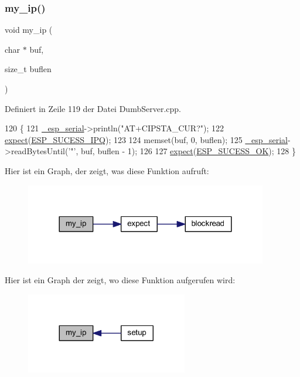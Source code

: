 \subsubsection{\texorpdfstring{my\+\_\+ip()}{my\_ip()}}
{\footnotesize\ttfamily void my\+\_\+ip (\begin{DoxyParamCaption}\item[{char $\ast$}]{buf,  }\item[{size\+\_\+t}]{buflen }\end{DoxyParamCaption})}



Definiert in Zeile 119 der Datei Dumb\+Server.\+cpp.


\begin{DoxyCode}
120 \{
121   \hyperlink{class_esp_server_a552aab874ad99b696f4c997d6f5a4746}{\_esp\_serial}->println(\textcolor{stringliteral}{"AT+CIPSTA\_CUR?"});
122   \hyperlink{class_esp_server_aff5ea67ab96af075223b2b836036ccf1}{expect}(\hyperlink{_dumb_server_8cpp_a4a3c8fcc7b628944ea321ad928a00bd9}{ESP\_SUCESS\_IPQ});
123 
124   memset(buf, 0, buflen);
125   \hyperlink{class_esp_server_a552aab874ad99b696f4c997d6f5a4746}{\_esp\_serial}->readBytesUntil(\textcolor{charliteral}{'"'}, buf, buflen - 1);
126 
127   \hyperlink{class_esp_server_aff5ea67ab96af075223b2b836036ccf1}{expect}(\hyperlink{_dumb_server_8cpp_a62497fcb12b1cedd5fdfbc0755508d87}{ESP\_SUCESS\_OK});
128 \}
\end{DoxyCode}
Hier ist ein Graph, der zeigt, was diese Funktion aufruft\+:\nopagebreak
\begin{figure}[H]
\begin{center}
\leavevmode
\includegraphics[width=300pt]{class_esp_server_a01953c4cc039c37f94dc3e1057126abb_cgraph}
\end{center}
\end{figure}
Hier ist ein Graph der zeigt, wo diese Funktion aufgerufen wird\+:\nopagebreak
\begin{figure}[H]
\begin{center}
\leavevmode
\includegraphics[width=200pt]{class_esp_server_a01953c4cc039c37f94dc3e1057126abb_icgraph}
\end{center}
\end{figure}
\mbox{\label{class_esp_server_a9040fa1d479d71edf3a826f4691c35c4}} 

